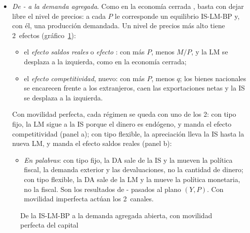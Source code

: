 \documentclass[11pt]{article}
\begin{document}
\begin{itemize}
\item \emph{De - a la demanda agregada}. Como en la economía cerrada , basta con dejar libre el nivel de precios: a cada $P$ le corresponde un equilibrio IS-LM-BP y, con él, una producción demandada. Un nivel de precios más alto tiene 2~efectos (gráfico~\ref{fig:derivacion-da}):
  \begin{itemize}
  \item el \emph{efecto saldos reales} o \emph{efecto }: con más $P$, menos $M/P$, y la LM se desplaza a la izquierda, como en la economía cerrada;
  \item el \emph{efecto competitividad}, nuevo: con más $P$, menos $q$; los bienes nacionales se encarecen frente a los extranjeros, caen las exportaciones netas y la IS se desplaza a la izquierda.
  \end{itemize}
  Con movilidad perfecta, cada régimen se queda con uno de los 2: con tipo fijo, la LM sigue a la IS porque el dinero es endógeno, y manda el efecto competitividad (panel a); con tipo flexible, la apreciación lleva la IS hasta la nueva LM, y manda el efecto saldos reales (panel b):
  \begin{itemize}
  \item \emph{En palabras}: con tipo fijo, la DA sale de la IS y la mueven la política fiscal, la demanda exterior y las devaluaciones, no la cantidad de dinero; con tipo flexible, la DA sale de la LM y la mueve la política monetaria, no la fiscal. Son los resultados de - pasados al plano $(Y,P)$. Con movilidad imperfecta actúan los 2~canales.
  \end{itemize}
\end{itemize}

\begin{figure}[H]
\centering
\caption{De la IS-LM-BP a la demanda agregada abierta, con movilidad perfecta del capital}\label{fig:derivacion-da}
\end{figure}
\end{document}
